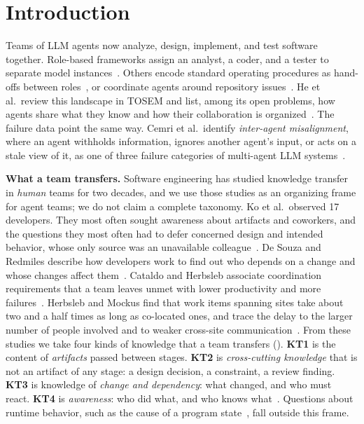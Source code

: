 \documentclass[10pt,conference]{IEEEtran}
\theoremstyle{definition}
\begin{document}
\section{Introduction}\label{sec:introduction}

Teams of LLM agents now analyze, design, implement, and test software together. Role-based frameworks
assign an analyst, a coder, and a tester to separate model instances~\cite{dong2024selfcollab}. Others
encode standard operating procedures as hand-offs between roles~\cite{hong2024metagpt,qian2024chatdev}, or
coordinate agents around repository issues~\cite{tao2024magis}. He et al.\ review this landscape in TOSEM
and list, among its open problems, how agents share what they know and how their collaboration is
organized~\cite{he2025lma}. The failure data point the same way. Cemri et al.\ identify
\emph{inter-agent misalignment}, where an agent withholds information, ignores another agent's input, or
acts on a stale view of it, as one of three failure categories of multi-agent LLM
systems~\cite{cemri2025mast}.

\smallskip\noindent\textbf{What a team transfers.} Software engineering has studied knowledge transfer
in \emph{human} teams for two decades, and we use those studies as an organizing frame for agent teams;
we do not claim a complete taxonomy. Ko et al.\ observed 17 developers. They most often sought awareness
about artifacts and coworkers, and the questions they most often had to defer concerned design and intended
behavior, whose only source was an unavailable colleague~\cite{ko2007information}. De Souza and Redmiles
describe how developers work to find out who depends on a change and whose changes affect
them~\cite{desouza2008dependencies}. Cataldo and Herbsleb associate coordination requirements that a team
leaves unmet with lower productivity and more failures~\cite{cataldo2013coordination}. Herbsleb and Mockus
find that work items spanning sites take about two and a half times as long as co-located ones, and trace
the delay to the larger number of people involved and to weaker cross-site
communication~\cite{herbsleb2003speed}. From these studies we take four kinds of knowledge that a team
transfers (). \textbf{KT1} is the content of \emph{artifacts} passed between stages.
\textbf{KT2} is \emph{cross-cutting knowledge} that is not an artifact of any stage: a design decision, a
constraint, a review finding. \textbf{KT3} is knowledge of \emph{change and dependency}: what changed, and
who must react. \textbf{KT4} is \emph{awareness}: who did what, and who knows what~\cite{mockus2002expertise}.
Questions about runtime behavior, such as the cause of a program state~\cite{ko2007information}, fall
outside this frame.
\end{document}
